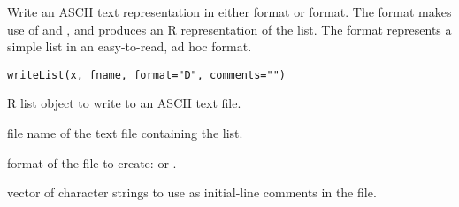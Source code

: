 \documentclass[letterpaper]{book}
\begin{document}
\begin{Description}\relax
Write an ASCII text representation in either  format or  format. 
The  format makes use of  and , and produces an R 
representation of the list. The  format represents a simple list in an 
easy-to-read, ad hoc  format.
\end{Description}
\begin{Usage}
\begin{verbatim}
writeList(x, fname, format="D", comments="")
\end{verbatim}
\end{Usage}
\begin{Arguments}
\begin{ldescription}
\item[\code{x}] R list object to write to an ASCII text file.
\item[\code{fname}] file name of the text file containing the list.
\item[\code{format}] format of the file to create:  or .
\item[\code{comments}] vector of character strings to use as initial-line comments in the file.
\end{ldescription}
\end{Arguments}
\end{document}
